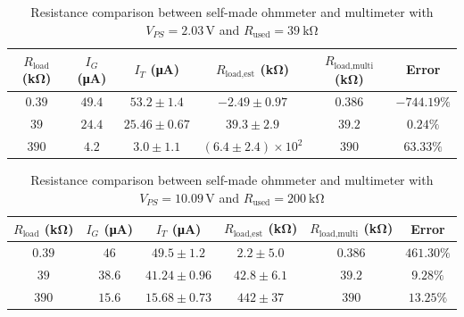 \begin{table}[htb!]
\centering
\caption{Resistance comparison between self-made ohmmeter and multimeter with $V_{PS}=2.03\,\mathrm{V}$ and $R_{\text{used}}=\qty{39}{\kohm}$}
\begin{tabular}{cccccc}
\toprule
$R_{\text{load}}$ (\unit{\kohm}) & $I_G$ (\unit{\uA}) & $I_T$ (\unit{\uA}) & $R_{\text{load,est}}$ (\unit{\kohm}) & $R_{\text{load,multi}}$ (\unit{\kohm}) & Error \\
\midrule
$0.39$ & $49.4$ & $53.2 \pm 1.4$ & $-2.49 \pm 0.97$ & $0.386$ & $-744.19\%$ \\
$39$ & $24.4$ & $25.46 \pm 0.67$ & $39.3 \pm 2.9$ & $39.2$ & $0.24\%$ \\
$390$ & $4.2$ & $3.0 \pm 1.1$ & $(6.4 \pm 2.4)\times 10^{2}$ & $390$ & $63.33\%$ \\
\bottomrule
\end{tabular}
\end{table}
\begin{table}[htb!]
\centering
\caption{Resistance comparison between self-made ohmmeter and multimeter with $V_{PS}=10.09\,\mathrm{V}$ and $R_{\text{used}}=\qty{200}{\kohm}$}
\begin{tabular}{cccccc}
\toprule
$R_{\text{load}}$ (\unit{\kohm}) & $I_G$ (\unit{\uA}) & $I_T$ (\unit{\uA}) & $R_{\text{load,est}}$ (\unit{\kohm}) & $R_{\text{load,multi}}$ (\unit{\kohm}) & Error \\
\midrule
$0.39$ & $46$ & $49.5 \pm 1.2$ & $2.2 \pm 5.0$ & $0.386$ & $461.30\%$ \\
$39$ & $38.6$ & $41.24 \pm 0.96$ & $42.8 \pm 6.1$ & $39.2$ & $9.28\%$ \\
$390$ & $15.6$ & $15.68 \pm 0.73$ & $442 \pm 37$ & $390$ & $13.25\%$ \\
\bottomrule
\end{tabular}
\end{table}
